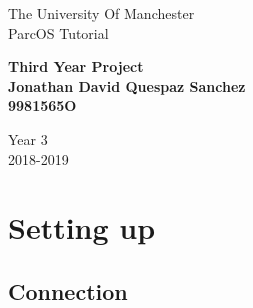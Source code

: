 \documentclass[a4paper]{article}
\begin{document}
\begin{titlepage}
\begin{center}
\begin{huge}
\vspace*{0.8in}
The University Of Manchester\\
\vspace*{0.8in}
ParcOS Tutorial\\
\vspace*{1.0in}
\end{huge}
\begin{Huge}
\textbf{Third Year Project} \\
\vspace*{0.8in}
\textbf{Jonathan David Quespaz Sanchez} \\
\vspace*{0.8in}
\textbf{9981565O} \\
\end{Huge}
\vspace*{1.0in}
\begin{huge}
Year 3\\
\vspace*{0.8in}
2018-2019\\
\end{huge}
\end{center}
\end{titlepage}
\newpage

\section*{Setting up}

\subsection*{Connection}

\newpage
\end{document}
